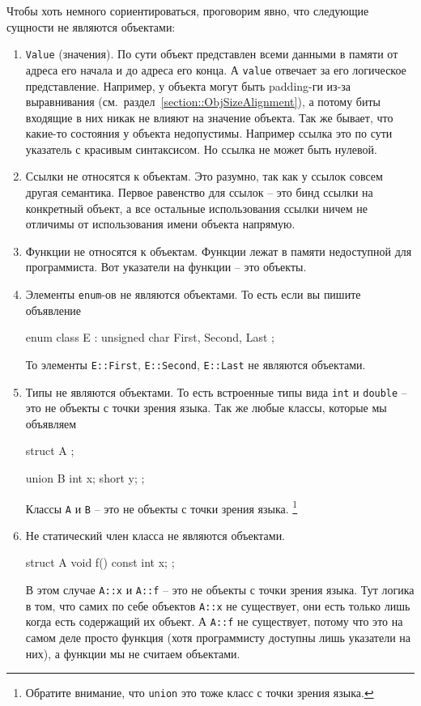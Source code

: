 \documentclass{article}
\begin{document}
Чтобы хоть немного сориентироваться, проговорим явно, что следующие сущности не являются объектами:
\begin{enumerate}
\item \verb"Value" (значения).
По сути объект представлен всеми данными в памяти от адреса его начала и до адреса его конца.
А \verb"value" отвечает за его логическое представление.
Например, у объекта могут быть padding-ги из-за выравнивания (см.~раздел~\ref{section::ObjSizeAlignment}), а потому биты входящие в них никак не влияют на значение объекта.
Так же бывает, что какие-то состояния у объекта недопустимы.
Например ссылка это по сути указатель с красивым синтаксисом.
Но ссылка не может быть нулевой.

\item Ссылки не относятся к объектам.
Это разумно, так как у ссылок совсем другая семантика.
Первое равенство для ссылок -- это бинд ссылки на конкретный объект, а все остальные использования ссылки ничем не отличимы от использования имени объекта напрямую.

\item Функции не относятся к объектам.
Функции лежат в памяти недоступной для программиста.
Вот указатели на функции -- это объекты.

\item Элементы \verb"enum"-ов не являются объектами.
То есть если вы пишите объявление
\begin{cppcode}[numbers = none]
enum class E : unsigned char {
  First, Second, Last
};
\end{cppcode}
То элементы \verb"E::First", \verb"E::Second", \verb"E::Last" не являются объектами.

\item Типы не являются объектами.
То есть встроенные типы вида \verb"int" и \verb"double" -- это не объекты с точки зрения языка.
Так же любые классы, которые мы объявляем
\begin{cppcode}[numbers = none]
struct A  {};

union B {
  int x;
  short y;
};
\end{cppcode}
Классы \verb"A" и \verb"B" -- это не объекты с точки зрения языка.%
\footnote{Обратите внимание, что \verb"union" это тоже класс с точки зрения языка.}

\item Не статический член класса не являются объектами.
\begin{cppcode}[numbers = none]
struct A  {
  void f() const {}
  int x;
};
\end{cppcode}
В этом случае \verb"A::x" и \verb"A::f" -- это не объекты с точки зрения языка.
Тут логика в том, что самих по себе объектов \verb"A::x" не существует, они есть только лишь когда есть содержащий их объект.
А \verb"A::f" не существует, потому что это на самом деле просто функция (хотя программисту доступны лишь указатели на них), а функции мы не считаем объектами.


\end{enumerate}
\end{document}
